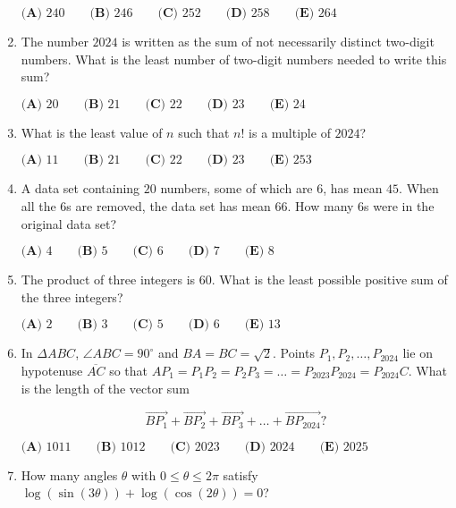 \documentclass{article}
\begin{document}
\begin{enumerate}[label=\arabic*., itemsep=0.5em]
$\textbf{(A) }240\qquad\textbf{(B) }246\qquad\textbf{(C) }252\qquad\textbf{(D) }258\qquad\textbf{(E) }264$\par \vspace{0.5em}\item The number $2024$ is written as the sum of not necessarily distinct two-digit numbers. What is the least number of two-digit numbers needed to write this sum?

$\textbf{(A) }20\qquad\textbf{(B) }21\qquad\textbf{(C) }22\qquad\textbf{(D) }23\qquad\textbf{(E) }24$\par \vspace{0.5em}\item What is the least value of $n$ such that $n!$ is a multiple of $2024$?

$
\textbf{(A) }11 \qquad
\textbf{(B) }21 \qquad
\textbf{(C) }22 \qquad
\textbf{(D) }23 \qquad
\textbf{(E) }253 \qquad
$\par \vspace{0.5em}\item A data set containing $20$ numbers, some of which are $6$, has mean $45$. When all the 6s are removed, the data set has mean $66$. How many 6s were in the original data set?

$\textbf{(A) }4\qquad\textbf{(B) }5\qquad\textbf{(C) }6\qquad\textbf{(D) }7\qquad\textbf{(E) }8$\par \vspace{0.5em}\item The product of three integers is $60$. What is the least possible positive sum of the three integers?

$\textbf{(A) } 2 \qquad \textbf{(B) } 3 \qquad \textbf{(C) } 5 \qquad \textbf{(D) } 6 \qquad \textbf{(E) } 13$\par \vspace{0.5em}\item In $\Delta ABC$, $\angle ABC = 90^\circ$ and $BA = BC = \sqrt{2}$. Points $P_1, P_2, \dots, P_{2024}$ lie on hypotenuse $\overline{AC}$ so that $AP_1= P_1P_2 = P_2P_3 = \dots = P_{2023}P_{2024} = P_{2024}C$. What is the length of the vector sum

\begin{equation*}
\overrightarrow{BP_1} + \overrightarrow{BP_2} + \overrightarrow{BP_3} + \dots + \overrightarrow{BP_{2024}}?
\end{equation*}

$
\textbf{(A) }1011 \qquad
\textbf{(B) }1012 \qquad
\textbf{(C) }2023 \qquad
\textbf{(D) }2024 \qquad
\textbf{(E) }2025 \qquad
$\par \vspace{0.5em}\item How many angles $\theta$ with $0\le\theta\le2\pi$ satisfy $\log(\sin(3\theta))+\log(\cos(2\theta))=0$?  


\end{enumerate}
\end{document}
